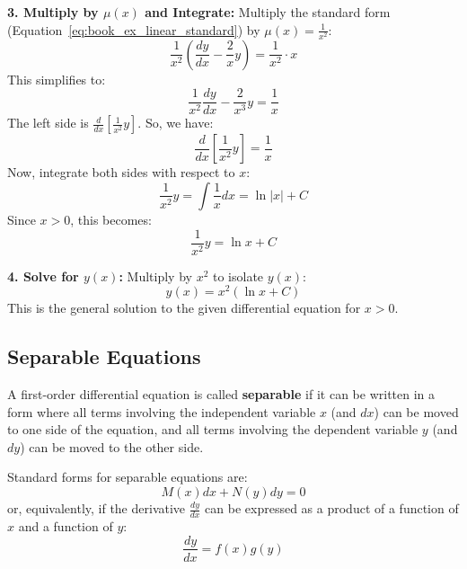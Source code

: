 \documentclass[12pt, letterpaper]{book}
\begin{document}
\textbf{3. Multiply by $\mu(x)$ and Integrate:}
Multiply the standard form (Equation~\ref{eq:book_ex_linear_standard}) by $\mu(x) = \frac{1}{x^2}$:
\begin{equation}
    \frac{1}{x^2}\left(\frac{dy}{dx} - \frac{2}{x}y\right) = \frac{1}{x^2} \cdot x
\end{equation}
This simplifies to:
\begin{equation}
    \frac{1}{x^2}\frac{dy}{dx} - \frac{2}{x^3}y = \frac{1}{x}
\end{equation}
The left side is $\frac{d}{dx}\left[\frac{1}{x^2}y\right]$. So, we have:
\begin{equation}
    \frac{d}{dx}\left[\frac{1}{x^2}y\right] = \frac{1}{x}
\end{equation}
Now, integrate both sides with respect to $x$:
\begin{equation}
    \frac{1}{x^2}y = \int \frac{1}{x}dx = \ln|x| + C
\end{equation}
Since $x > 0$, this becomes:
\begin{equation}
    \frac{1}{x^2}y = \ln x + C
\end{equation}

\textbf{4. Solve for $y(x)$:}
Multiply by $x^2$ to isolate $y(x)$:
\begin{equation}
    y(x) = x^2(\ln x + C)
    \label{eq:book_ex_linear_solution}
\end{equation}
This is the general solution to the given differential equation for $x > 0$.

\subsection{Separable Equations}
\label{ssec:separable_equations}

A first-order differential equation is called \textbf{separable} if it can be written in a form where all terms involving the independent variable $x$ (and $dx$) can be moved to one side of the equation, and all terms involving the dependent variable $y$ (and $dy$) can be moved to the other side.

Standard forms for separable equations are:
\begin{equation}
    M(x)dx + N(y)dy = 0
    \label{eq:book_separable_form1}
\end{equation}
or, equivalently, if the derivative $\frac{dy}{dx}$ can be expressed as a product of a function of $x$ and a function of $y$:
\begin{equation}
    \frac{dy}{dx} = f(x)g(y)
    \label{eq:book_separable_form2}
\end{equation}
\end{document}
